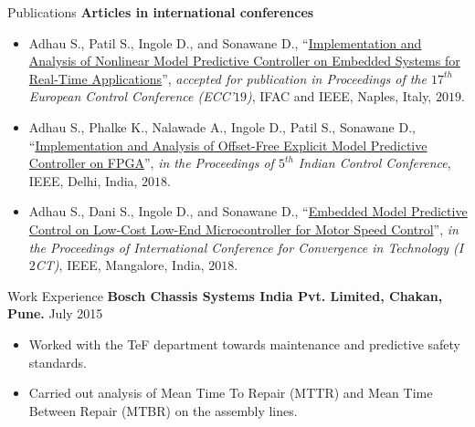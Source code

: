 \documentclass[11pt]{resume}
\newenvironment{outerlist}[1][\enskip\textbullet]%
{\begin{itemize}[#1,leftmargin=*]}{\end{itemize}%
	\vspace{-.5\baselineskip}}
\begin{document}
\begin{rSection}{Publications}
	\textbf{Articles in international conferences}
	\begin{outerlist}
	\item Adhau S., Patil S., Ingole D., and Sonawane D., ``\href{https://www.researchgate.net/publication/331225239_Implementation_and_Analysis_of_Nonlinear_Model_Predictive_Controller_on_Embedded_Systems_for_Real-Time_Applications}{Implementation and Analysis of Nonlinear Model Predictive Controller on Embedded Systems for Real-Time Applications}'', \textit{accepted for publication in Proceedings of the $ 17^{th} $ European Control Conference (ECC'$19 $)}, IFAC and IEEE, Naples, Italy, $ 2019 $.

	\item Adhau S., Phalke K., Nalawade A., Ingole D., Patil S., Sonawane D., ``\href{https://saketadhau.netlify.com/publication/icc/icc.pdf}{Implementation and Analysis of Offset-Free Explicit Model Predictive Controller on FPGA}'', \textit{in the Proceedings of $ 5^{th} $ Indian Control Conference}, IEEE, Delhi, India, $ 2018 $.

	\item Adhau S., Dani S., Ingole D., and Sonawane D., ``\href{https://saketadhau.netlify.com/publication/i2ct/i2ct.pdf}{Embedded Model Predictive Control on Low-Cost Low-End Microcontroller for Motor Speed Control}'', \textit{in the Proceedings of International Conference for Convergence in Technology (I$ 2 $CT)}, IEEE, Mangalore, India, $ 2018 $.	
	\end{outerlist}
\end{rSection}	
\begin{rSection}{Work Experience}
{\textbf{Bosch Chassis Systems India Pvt. Limited, Chakan, Pune.} \hfill July 2015}
\begin{outerlist}
	\item  Worked with the TeF department towards maintenance and predictive safety standards.
	\item Carried out analysis of Mean Time To Repair (MTTR) and Mean Time Between Repair (MTBR) on the assembly lines.
\end{outerlist}
\end{rSection}	
\vspace{2in}
\end{document}
